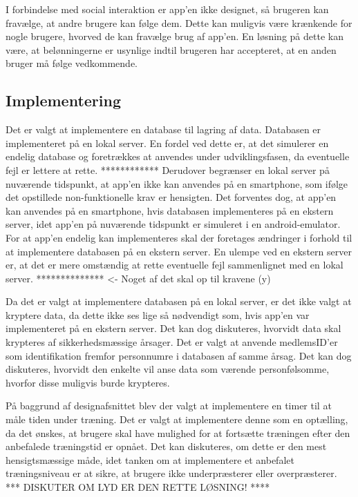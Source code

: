 I forbindelse med social interaktion er app’en ikke designet, så brugeren kan fravælge, at andre brugere kan følge dem. Dette kan muligvis være krænkende  for nogle brugere, hvorved de kan fravælge brug af app’en. En løsning på dette kan være, at belønningerne er usynlige indtil brugeren har accepteret, at en anden bruger må følge vedkommende.

\subsection{Implementering}
Det er valgt at implementere en database til lagring af data. Databasen er 
implementeret på en lokal server. En fordel ved dette er, at det simulerer en endelig database og foretrækkes at anvendes under udviklingsfasen, da eventuelle fejl er lettere at rette. ************ Derudover begrænser en lokal server på nuværende tidspunkt, at app’en ikke kan anvendes på en smartphone, som ifølge det opstillede non-funktionelle krav er hensigten. Det forventes dog, at app'en kan anvendes på en smartphone, hvis databasen implementeres på en ekstern server, idet app’en på nuværende tidspunkt er simuleret i en android-emulator. For at app’en endelig kan implementeres skal der foretages ændringer i forhold til at  implementere databasen på en ekstern server.
En ulempe ved en ekstern server er, at det er mere omstændig at rette eventuelle fejl sammenlignet med en lokal server. ************** <- Noget af det skal op til kravene (y)

Da det er valgt at implementere databasen på en lokal server, er det ikke valgt at kryptere data, da dette ikke ses lige så nødvendigt som, hvis app’en var implementeret på en ekstern server. Det kan dog diskuteres, hvorvidt data skal krypteres af sikkerhedsmæssige årsager. Det er valgt at anvende medlemsID’er som identifikation fremfor personnumre i databasen af samme årsag. Det kan dog diskuteres, hvorvidt den enkelte vil anse data som værende personfølsomme, hvorfor disse muligvis burde krypteres. 

På baggrund af designafsnittet blev der valgt at implementere en timer til at måle tiden under træning. Det er valgt at implementere denne som en optælling, da det ønskes, at brugere skal have mulighed for at fortsætte træningen efter den anbefalede træningstid er opnået. Det kan diskuteres, om dette er den mest hensigtsmæssige måde, idet tanken om at implementere et anbefalet træningsniveau er at sikre, at brugere ikke underpræsterer eller overpræsterer. *** DISKUTER OM LYD ER DEN RETTE LØSNING! ****